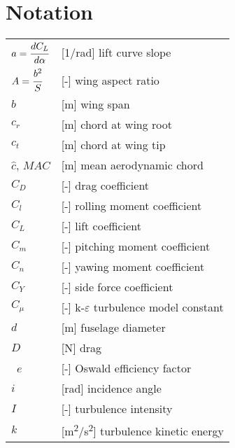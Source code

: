 \clearpage %
{}
\chapter*{Notation}
\markright{}

\begin{longtable}[l]{ l p{} }
  $a=\cfrac{dC_L}{d \alpha}$                   & [1/rad] lift curve slope \\
  $A=\cfrac{b^2}{S}$                           & [-] wing aspect ratio \\
  $b$                                          & [m] wing span \\
  $c_r$                                        & [m] chord at wing root \\
  $c_t$                                        & [m] chord at wing tip \\
  $\hat c$, $MAC$                              & [m] mean aerodynamic chord \\
  $C_D$                                        & [-] drag coefficient \\
  $C_l$                                        & [-] rolling moment coefficient \\
  $C_L$                                        & [-] lift coefficient \\
  $C_m$                                        & [-] pitching moment coefficient \\
  $C_n$                                        & [-] yawing moment coefficient \\
  $C_Y$                                        & [-] side force coefficient \\
  $C_{\mu}$                                    & [-] k-$\varepsilon$ turbulence model constant \\
  $d$                                          & [m] fuselage diameter \\
  $D$                                          & [N] drag \\\
  $e$                                          & [-] Oswald efficiency factor \\
  $i$                                          & [rad] incidence angle \\
  $I$                                          & [-] turbulence intensity \\
  $k$                                          & [m\textsuperscript{2}/s\textsuperscript{2}] turbulence kinetic energy \\

\end{longtable}
